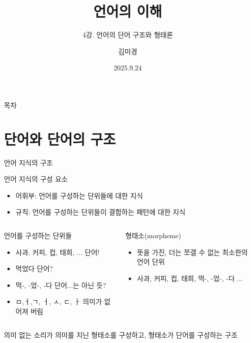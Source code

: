 \documentclass[11pt, aspectratio=169]{beamer}
\title{언어의 이해}
\subtitle{4강. 언어의 단어 구조와 형태론}
\author{김미경}
\date{2025.9.24}
\begin{document}
\frame{\titlepage}

\begin{frame}[t]{목차}
\tableofcontents
\end{frame}

\section{단어와 단어의 구조}

\begin{frame}[t]{언어 지식의 구조}
    \begin{block}{언어 지식의 구성 요소}
      \begin{itemize}
        \item 어휘부: 언어를 구성하는 단위들에 대한 지식
        \item 규칙: 언어를 구성하는 단위들이 결합하는 패턴에 대한 지식
      \end{itemize}
    \end{block}
    \begin{columns}
      \begin{column}[T]{0.47\textwidth}
        \begin{block}{언어를 구성하는 단위들}
          \begin{itemize}
            \item 사과, 커피, 컵, 태희, ... \leftarrow 단어! 
            \item 먹었다 \leftarrow 단어?
            \item 먹-, -었-, -다 \leftarrow 단어...는 아닌 듯?
            \item ㅁ,ㅓ,ㄱ, ㅓ, ㅅ, ㄷ, ㅏ \leftarrow 의미가 없어져 버림
          \end{itemize}
        \end{block}        
      \end{column}
      \begin{column}[T]{0.46\textwidth}
        \begin{block}{형태소(morpheme)}
          \begin{itemize}
            \item 뜻을 가진, 더는 쪼갤 수 없는 최소한의 언어 단위
            \item 사과, 커피, 컵, 태희, 먹-, -었-, -다 ... 
          \end{itemize}
        \end{block}        
      \end{column}
    \end{columns}
    \begin{center}
       의미 없는 소리가 의미를 지닌 형태소를 구성하고, 형태소가 단어를 구성하는 구조
    \end{center}
\end{frame}
\end{document}
